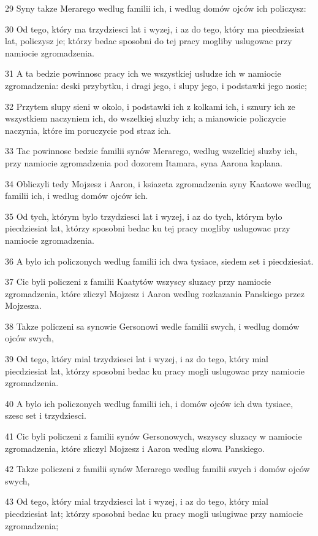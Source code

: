 \par 29 Syny takze Merarego wedlug familii ich, i wedlug domów ojców ich policzysz:
\par 30 Od tego, który ma trzydziesci lat i wyzej, i az do tego, który ma piecdziesiat lat, policzysz je; którzy bedac sposobni do tej pracy mogliby uslugowac przy namiocie zgromadzenia.
\par 31 A ta bedzie powinnosc pracy ich we wszystkiej usludze ich w namiocie zgromadzenia: deski przybytku, i dragi jego, i slupy jego, i podstawki jego nosic;
\par 32 Przytem slupy sieni w okolo, i podstawki ich z kolkami ich, i sznury ich ze wszystkiem naczyniem ich, do wszelkiej sluzby ich; a mianowicie policzycie naczynia, które im poruczycie pod straz ich.
\par 33 Tac powinnosc bedzie familii synów Merarego, wedlug wszelkiej sluzby ich, przy namiocie zgromadzenia pod dozorem Itamara, syna Aarona kaplana.
\par 34 Obliczyli tedy Mojzesz i Aaron, i ksiazeta zgromadzenia syny Kaatowe wedlug familii ich, i wedlug domów ojców ich.
\par 35 Od tych, którym bylo trzydziesci lat i wyzej, i az do tych, którym bylo piecdziesiat lat, którzy sposobni bedac ku tej pracy mogliby uslugowac przy namiocie zgromadzenia.
\par 36 A bylo ich policzonych wedlug familii ich dwa tysiace, siedem set i piecdziesiat.
\par 37 Cic byli policzeni z familii Kaatytów wszyscy sluzacy przy namiocie zgromadzenia, które zliczyl Mojzesz i Aaron wedlug rozkazania Panskiego przez Mojzesza.
\par 38 Takze policzeni sa synowie Gersonowi wedle familii swych, i wedlug domów ojców swych,
\par 39 Od tego, który mial trzydziesci lat i wyzej, i az do tego, który mial piecdziesiat lat, którzy sposobni bedac ku pracy mogli uslugowac przy namiocie zgromadzenia.
\par 40 A bylo ich policzonych wedlug familii ich, i domów ojców ich dwa tysiace, szesc set i trzydziesci.
\par 41 Cic byli policzeni z familii synów Gersonowych, wszyscy sluzacy w namiocie zgromadzenia, które zliczyl Mojzesz i Aaron wedlug slowa Panskiego.
\par 42 Takze policzeni z familii synów Merarego wedlug familii swych i domów ojców swych,
\par 43 Od tego, który mial trzydziesci lat i wyzej, i az do tego, który mial piecdziesiat lat; którzy sposobni bedac ku pracy mogli uslugiwac przy namiocie zgromadzenia;
